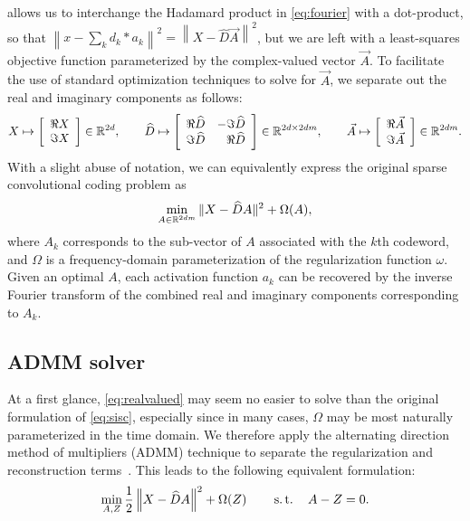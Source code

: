 \documentclass{article} %
\begin{document}
 allows us to interchange the Hadamard product in
\eqref{eq:fourier} with a dot-product, so that 
$\left\|x - \sum_k d_k * a_k\right\|^2 =  \left\|X - \widehat{D}\vec{A}\right\|^2$,
but we are left with a least-squares objective function parameterized by the complex-valued 
vector $\vec{A}$. To facilitate the use of standard optimization techniques to solve for
$\vec{A}$, we separate out the real and imaginary components as follows:
\begin{equation}
X \mapsto \left[\begin{array}{r}\Re X \\ \Im X\end{array}\right] \in \mathbb{R}^{2d},
\quad\quad \widehat{D} \mapsto \left[\begin{array}{rr}\Re \widehat{D} & - \Im \widehat{D}\\
\Im \widehat{D} & \Re \widehat{D}\end{array}\right] \in \mathbb{R}^{2d\times 2dm},
\quad\quad \vec{A} \mapsto \left[\begin{array}{r}\Re \vec{A} \\ \Im \vec{A}\end{array}\right]
\in \mathbb{R}^{2dm}.\label{eq:realized}
\end{equation}
With a slight abuse of notation, we can equivalently express the original sparse
convolutional coding problem as
\begin{equation}
\min_{A \in \mathbb{R}^{2dm}} \|X - \widehat{D}A\|^2 + \Omega(A),\label{eq:realvalued}
\end{equation}
where $A_k$ corresponds to the sub-vector of $A$ associated with the $k$th codeword, and 
$\Omega$ is a frequency-domain parameterization of the regularization function $\omega$.
Given an optimal $A$, each activation function $a_k$ can be 
recovered by the inverse Fourier transform of the combined real and imaginary components
corresponding to $A_k$.

\subsection{ADMM solver}
\label{sec:solver}
At a first glance, \eqref{eq:realvalued} may seem no easier to solve than the original
formulation of \eqref{eq:sisc}, especially since in many cases, $\Omega$ may be most
naturally parameterized in the time domain.  We therefore apply the alternating
direction method of multipliers (ADMM) technique to separate the regularization and
reconstruction terms~\cite{boyd2011}.  This leads to the following equivalent
formulation:
\begin{equation}
\min_{A, Z} \frac{1}{2}\left\|X - \widehat{D}A\right\|^2 + \Omega(Z)
\quad\quad \operatorname{s.t.}\quad A - Z = 0.\label{eq:admm}
\end{equation}
\end{document}
